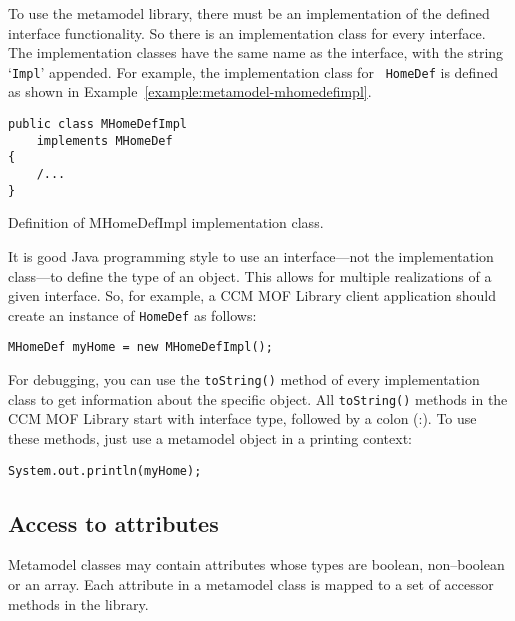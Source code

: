 To use the metamodel library, there must be an implementation of the defined
interface functionality. So there is an implementation class for every
interface. The implementation classes have the same name as the interface, with
the string `{\tt Impl}' appended. For example, the implementation class for {\tt
HomeDef} is defined as shown in Example~\ref{example:metamodel-mhomedefimpl}.

\begin{Example}
\begin{minifbox}
\begin{verbatim}
public class MHomeDefImpl
    implements MHomeDef
{
    /...
}
\end{verbatim}
\caption{Definition of MHomeDefImpl implementation class.}
\label{example:metamodel-mhomedefimpl}
\end{minifbox}
\end{Example}

It is good Java programming style to use an interface---not the implementation
class---to define the type of an object. This allows for multiple realizations
of a given interface. So, for example, a CCM MOF Library client application
should create an instance of {\tt HomeDef} as follows:

\begin{verbatim}
MHomeDef myHome = new MHomeDefImpl();
\end{verbatim}

For debugging, you can use the {\tt toString()} method of every implementation
class to get information about the specific object. All \verb+toString()+
methods in the CCM MOF Library start with interface type, followed by a colon
(:). To use these methods, just use a metamodel object in a printing context:

\begin{verbatim}
System.out.println(myHome);
\end{verbatim}

\subsection{Access to attributes}

Metamodel classes may contain attributes whose types are boolean, non--boolean
or an array. Each attribute in a metamodel class is mapped to a set of accessor
methods in the library.

